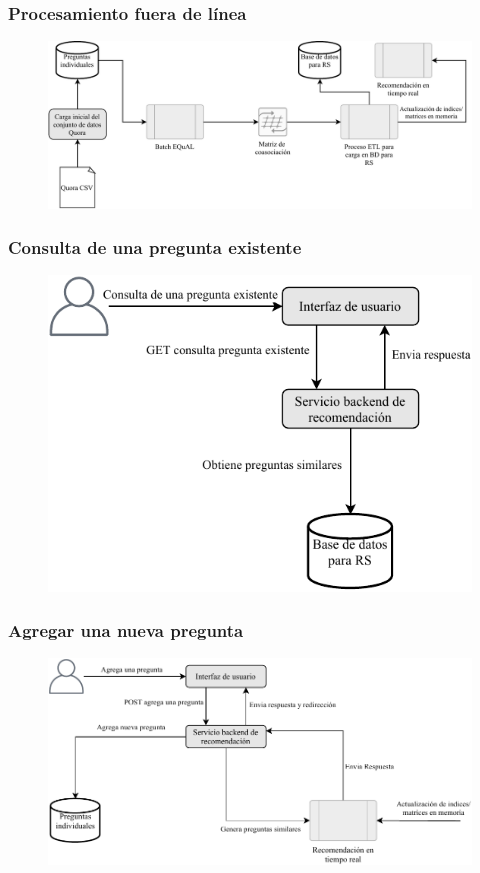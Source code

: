 \begin{frame}
	\frametitle{Procesamiento fuera de línea}
	\begin{figure}
		\includegraphics[width=0.9\linewidth]{../8_problema_investigacion/imagenes/implementacion_rs_batch}
		\label{fig:implementacionrsbatch}
	\end{figure}
\end{frame}

\begin{frame}
	\frametitle{Consulta de una pregunta existente}
	\begin{figure}
		\includegraphics[width=0.7\linewidth]{../8_problema_investigacion/imagenes/implementacion_rs_consulta}
		\label{fig:implementacionrsconsulta}
	\end{figure}
\end{frame}

\begin{frame}
	\frametitle{Agregar una nueva pregunta}
	\begin{figure}
		\includegraphics[width=0.7\linewidth]{../8_problema_investigacion/imagenes/implementacion_rs_agregar}
		\label{fig:implementacionrsagregar}
	\end{figure}
\end{frame}